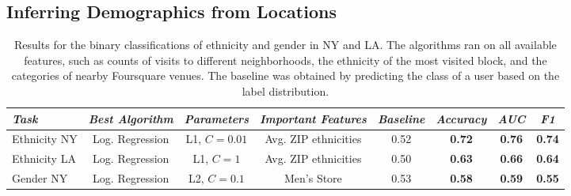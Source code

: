 \subsection{Inferring Demographics from Locations}


\begin{table}[htb!]
\small
\begin{center}
\begin{tabular}{| l | c | c | c | c | c | c | c |}
\hline
\textit{Task} & \textit{Best Algorithm} & \textit{Parameters} & \textit{Important Features} & \textit{Baseline} & \textit{Accuracy} & \textit{AUC} & \textit{F1} \\ \hline
Ethnicity NY    & Log. Regression  & L1, $C=0.01$  & Avg. ZIP ethnicities & 0.52 & \textbf{0.72} & \textbf{0.76} & \textbf{0.74} \\ \hline
Ethnicity LA     & Log. Regression  & L1, $C=1$     & Avg. ZIP ethnicities & 0.50 & \textbf{0.63} & \textbf{0.66} & \textbf{0.64} \\ \hline
Gender NY & Log. Regression & L2, $C=0.1$ & Men's Store &   0.53  & \textbf{0.58} & \textbf{0.59} & \textbf{0.55} \\ \hline
\end{tabular}
\caption{Results for the binary classifications of ethnicity and gender in NY and LA. The algorithms ran on all available features, such as counts of visits to different neighborhoods, the ethnicity of the most visited block, and the categories of nearby Foursquare venues. The baseline was obtained by predicting the class of a user based on the label distribution.}
\label{tab:all-tasks}
\end{center}
\end{table}

